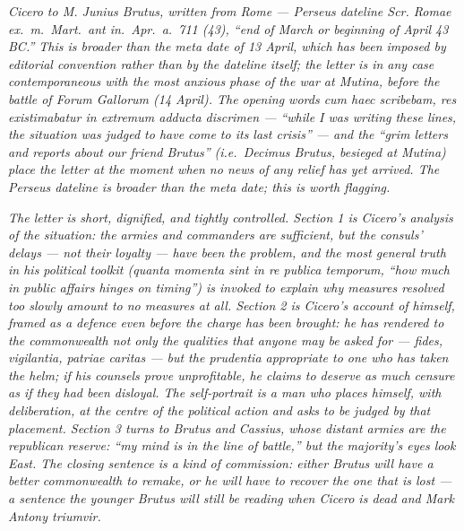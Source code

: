 
\textit{Cicero to M. Junius Brutus, written from Rome ---
Perseus dateline \textit{Scr. Romae ex.\ m.\ Mart.\ ant in.\
Apr.\ a.\ 711 (43)}, ``end of March or beginning of April
43 BC.'' This is broader than the meta date of 13 April,
which has been imposed by editorial convention rather than
by the dateline itself; the letter is in any case
contemporaneous with the most anxious phase of the war
at Mutina, before the battle of Forum Gallorum (14 April).
The opening words \textit{cum haec scribebam, res
existimabatur in extremum adducta discrimen} --- ``while
I was writing these lines, the situation was judged to
have come to its last crisis'' --- and the ``grim letters
and reports about our friend Brutus'' (i.e.\ Decimus
Brutus, besieged at Mutina) place the letter at the
moment when no news of any relief has yet arrived. The
Perseus dateline is broader than the meta date; this is
worth flagging.}

\textit{The letter is short, dignified, and tightly
controlled. Section 1 is Cicero's analysis of the
situation: the armies and commanders are sufficient, but
the consuls' delays --- not their loyalty --- have been
the problem, and the most general truth in his political
toolkit (\textit{quanta momenta sint in re publica
temporum}, ``how much in public affairs hinges on
timing'') is invoked to explain why measures resolved
too slowly amount to no measures at all. Section 2 is
Cicero's account of himself, framed as a defence even
before the charge has been brought: he has rendered to
the commonwealth not only the qualities that anyone may
be asked for --- \textit{fides}, \textit{vigilantia},
\textit{patriae caritas} --- but the \textit{prudentia}
appropriate to one who has taken the helm; if his
counsels prove unprofitable, he claims to deserve as
much censure as if they had been disloyal. The
self-portrait is a man who places himself, with
deliberation, at the centre of the political action and
asks to be judged by that placement. Section 3 turns
to Brutus and Cassius, whose distant armies are the
republican reserve: ``my mind is in the line of battle,''
but \textit{the majority's} eyes look East. The closing
sentence is a kind of commission: either Brutus will
have a better commonwealth to remake, or he will have
to recover the one that is lost --- a sentence the
younger Brutus will still be reading when Cicero is dead
and Mark Antony triumvir.}
